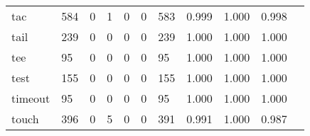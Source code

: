\begin{longtable}{lp{1.2cm}p{1.2cm}p{1.2cm}p{1.2cm}p{1.2cm}p{1.2cm}p{1.2cm}p{1.2cm}p{1.2cm}p{1.2cm}}
tac       &                                   584 &                                                  0 &                                                  1 &                                                  0 &                                                  0 &                                                583 &                                              0.999 &                                              1.000 &                                              0.998 \\
tail      &                                   239 &                                                  0 &                                                  0 &                                                  0 &                                                  0 &                                                239 &                                              1.000 &                                              1.000 &                                              1.000 \\
tee       &                                    95 &                                                  0 &                                                  0 &                                                  0 &                                                  0 &                                                 95 &                                              1.000 &                                              1.000 &                                              1.000 \\
test      &                                   155 &                                                  0 &                                                  0 &                                                  0 &                                                  0 &                                                155 &                                              1.000 &                                              1.000 &                                              1.000 \\
timeout   &                                    95 &                                                  0 &                                                  0 &                                                  0 &                                                  0 &                                                 95 &                                              1.000 &                                              1.000 &                                              1.000 \\
touch     &                                   396 &                                                  0 &                                                  5 &                                                  0 &                                                  0 &                                                391 &                                              0.991 &                                              1.000 &                                              0.987 \\

\end{longtable}
